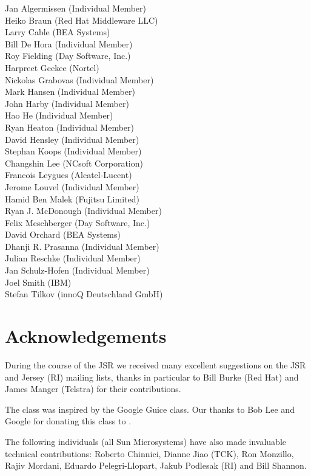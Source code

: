 Jan Algermissen (Individual Member) \\
Heiko Braun (Red Hat Middleware LLC) \\
Larry Cable (BEA Systems) \\
Bill De Hora (Individual Member) \\ 
Roy Fielding (Day Software, Inc.) \\
Harpreet Geekee (Nortel) \\
Nickolas Grabovas (Individual Member) \\
Mark Hansen (Individual Member) \\
John Harby (Individual Member) \\
Hao He (Individual Member) \\
Ryan Heaton (Individual Member) \\
David Hensley (Individual Member) \\
Stephan Koops (Individual Member) \\
Changshin Lee (NCsoft Corporation) \\
Francois Leygues (Alcatel-Lucent) \\
Jerome Louvel (Individual Member) \\
Hamid Ben Malek (Fujitsu Limited) \\
Ryan J. McDonough (Individual Member) \\
Felix Meschberger (Day Software, Inc.) \\
David Orchard (BEA Systems) \\
Dhanji R. Prasanna (Individual Member) \\
Julian Reschke (Individual Member) \\
Jan Schulz-Hofen (Individual Member) \\
Joel Smith (IBM) \\
Stefan Tilkov (innoQ Deutschland GmbH)

\section{Acknowledgements}

During the course of the JSR we received many excellent suggestions on the JSR and Jersey (RI) mailing lists, thanks in particular to Bill Burke (Red Hat) and James Manger (Telstra) for their contributions. 

The  class was inspired by the Google Guice  class. Our thanks to Bob Lee and Google for donating this class to \jaxrs.

The following individuals (all Sun Microsystems) have also made invaluable technical contributions: Roberto Chinnici, Dianne Jiao (TCK), Ron Monzillo, Rajiv Mordani, Eduardo Pelegri-Llopart, Jakub Podlesak (RI) and Bill Shannon.
